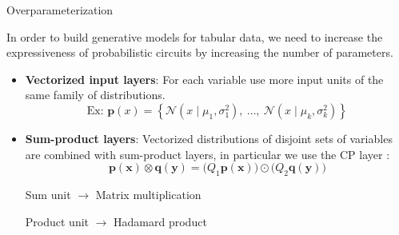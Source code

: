 \begin{frame}[fragile]{Overparameterization}

    In order to build generative models for tabular data, we need to increase the expressiveness of probabilistic circuits by increasing the number of parameters.

    
    \begin{itemize}
        \item \textbf{Vectorized input layers}: For each variable use more input units of the same family of distributions.
        \begin{equation}
            \text{Ex: } \mathbf{p}(x) = \left\{ \mathcal{N}(x \mid \mu_1, \sigma^2_1), \ \dots, \  \mathcal{N}(x \mid \mu_k, \sigma^2_k) \right\}
        \end{equation}
        
        \item \textbf{Sum-product layers}:        
        Vectorized distributions of disjoint sets of variables are combined with sum-product layers, in particular we use the CP layer \citep{loconte2025what}:
        \begin{equation}
        \mathbf{p}(\mathbf{x}) \otimes \mathbf{q}(\mathbf{y}) = \bigg ( Q_1\mathbf{p}(\mathbf{x}) \bigg ) \odot \bigg( Q_2\mathbf{q}(\mathbf{y}) \bigg) 
        \end{equation}

        Sum unit $\rightarrow$ Matrix multiplication

        Product unit $\rightarrow$ Hadamard product

    \end{itemize}
    
\end{frame}


    


